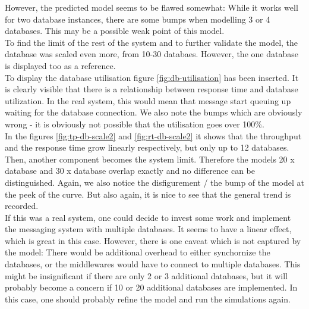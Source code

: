 \documentclass[a4paper]{article}
\begin{document}
However, the predicted model seems to be flawed somewhat: While it works well for two database instances, there are some bumps when modelling 3 or 4 databases. This may be a possible weak point of this model.\\

To find the limit of the rest of the system and to further validate the model, the database was scaled even more, from 10-30 databaes. However, the one database is displayed too as a reference.\\

To display the database utilisation figure \ref{fig:db-utilisation} has been inserted. It is clearly visible that there is a relationship between response time and database utilization. In the real system, this would mean that message start queuing up waiting for the database connection. We also note the bumps which are obviously wrong - it is obviously not possible that the utilisation goes over 100\%.\\

In the figures \ref{fig:tp-db-scale2} and \ref{fig:rt-db-scale2} it shows that the throughput and the response time grow linearly respectively, but only up to 12 databases. Then, another component becomes the system limit. Therefore the models 20 x database and 30 x database overlap exactly and no difference can be distinguished. Again, we also notice the disfigurement / the bump of the model at the peek of the curve. But also again, it is nice to see that the general trend is recorded.\\

If this was a real system, one could decide to invest some work and implement the messaging system with multiple databases. It seems to have a linear effect, which is great in this case. However, there is one caveat which is not captured by the model: There would be additional overhead to either synchornize the databases, or the middlewares would have to connect to multiple databases. This might be insignificant if there are only 2 or 3 additional databases, but it will probably become a concern if 10 or 20 additional databases are implemented. In this case, one should probably refine the model and run the simulations again.\\
\end{document}
